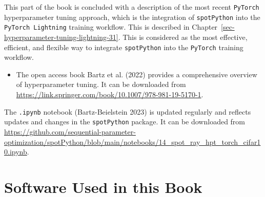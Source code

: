 \documentclass[
  letterpaper,
  DIV=11,
  numbers=noendperiod]{scrreprt}
\providecommand{\tightlist}{%
  \setlength{\itemsep}{0pt}\setlength{\parskip}{0pt}}\usepackage{longtable,booktabs,array}
\begin{document}
This part of the book is concluded with a description of the most recent
\texttt{PyTorch} hyperparameter tuning approach, which is the
integration of \texttt{spotPython} into the \texttt{PyTorch\ Lightning}
training workflow. This is described in
Chapter~\ref{sec-hyperparameter-tuning-lightning-31}. This is considered
as the most effective, efficient, and flexible way to integrate
\texttt{spotPython} into the \texttt{PyTorch} training workflow.

\begin{tcolorbox}[enhanced jigsaw, left=2mm, title=\textcolor{quarto-callout-tip-color}{\faLightbulb}\hspace{0.5em}{Hyperparameter Tuning Reference}, bottomrule=.15mm, titlerule=0mm, breakable, rightrule=.15mm, toprule=.15mm, coltitle=black, colbacktitle=quarto-callout-tip-color!10!white, leftrule=.75mm, arc=.35mm, colframe=quarto-callout-tip-color-frame, bottomtitle=1mm, colback=white, opacitybacktitle=0.6, toptitle=1mm, opacityback=0]

\begin{itemize}
\tightlist
\item
  The open access book Bartz et al. (2022) provides a comprehensive
  overview of hyperparameter tuning. It can be downloaded from
  \url{https://link.springer.com/book/10.1007/978-981-19-5170-1}.
\end{itemize}

\end{tcolorbox}

\begin{tcolorbox}[enhanced jigsaw, left=2mm, title=\textcolor{quarto-callout-note-color}{\faInfo}\hspace{0.5em}{Note}, bottomrule=.15mm, titlerule=0mm, breakable, rightrule=.15mm, toprule=.15mm, coltitle=black, colbacktitle=quarto-callout-note-color!10!white, leftrule=.75mm, arc=.35mm, colframe=quarto-callout-note-color-frame, bottomtitle=1mm, colback=white, opacitybacktitle=0.6, toptitle=1mm, opacityback=0]

The \texttt{.ipynb} notebook (Bartz-Beielstein 2023) is updated
regularly and reflects updates and changes in the \texttt{spotPython}
package. It can be downloaded from
\url{https://github.com/sequential-parameter-optimization/spotPython/blob/main/notebooks/14_spot_ray_hpt_torch_cifar10.ipynb}.

\end{tcolorbox}

\hypertarget{software-used-in-this-book}{%
\section*{Software Used in this Book}\label{software-used-in-this-book}}
\end{document}
